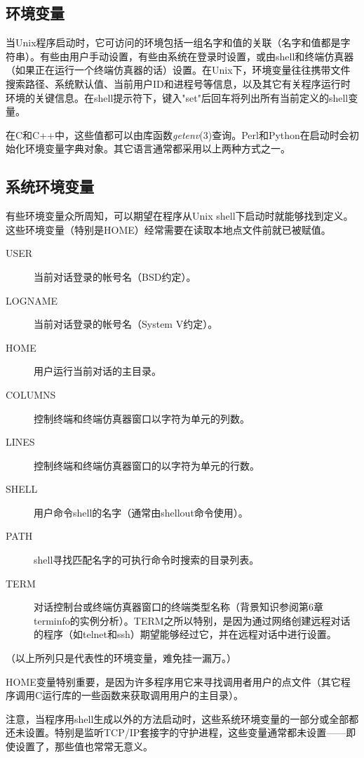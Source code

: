 \documentclass[12pt,oneside]{book}
\begin{document}
\begin{common-format}
\section{环境变量}
当Unix程序启动时，它可访问的环境包括一组名字和值的关联（名字和值都是字符串）。有些由用户手动设置，有些由系统在登录时设置，或由shell和终端仿真器（如果正在运行一个终端仿真器的话）设置。在Unix下，环境变量往往携带文件搜索路径、系统默认值、当前用户ID和进程号等信息，以及其它有关程序运行时环境的关键信息。在shell提示符下，键入"set"后回车将列出所有当前定义的shell变量。

在C和C++中，这些值都可以由库函数\textit{getenv}(3)查询。Perl和Python在启动时会初始化环境变量字典对象。其它语言通常都采用以上两种方式之一。

\subsection{系统环境变量}
有些环境变量众所周知，可以期望在程序从Unix shell下启动时就能够找到定义。这些环境变量（特别是HOME）经常需要在读取本地点文件前就已被赋值。
\begin{description}
\item[USER] 当前对话登录的帐号名（BSD约定）。
\item[LOGNAME] 当前对话登录的帐号名（System V约定）。
\item[HOME] 用户运行当前对话的主目录。
\item[COLUMNS] 控制终端和终端仿真器窗口以字符为单元的列数。
\item[LINES] 控制终端和终端仿真器窗口的以字符为单元的行数。
\item[SHELL] 用户命令shell的名字（通常由shellout命令使用）。
\item[PATH] shell寻找匹配名字的可执行命令时搜索的目录列表。
\item[TERM] 对话控制台或终端仿真器窗口的终端类型名称（背景知识参阅第6章terminfo的实例分析）。TERM之所以特别，是因为通过网络创建远程对话的程序（如telnet和ssh）期望能够经过它，并在远程对话中进行设置。
\end{description}    

（以上所列只是代表性的环境变量，难免挂一漏万。）

HOME变量特别重要，是因为许多程序用它来寻找调用者用户的点文件（其它程序调用C运行库的一些函数来获取调用用户的主目录）。

注意，当程序用shell生成以外的方法启动时，这些系统环境变量的一部分或全部都还未设置。特别是监听TCP/IP套接字的守护进程，这些变量通常都未设置——即使设置了，那些值也常常无意义。


\end{common-format}
\end{document}
